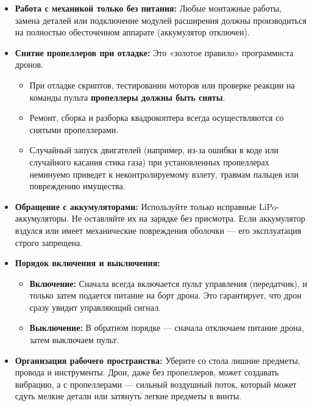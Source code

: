 \begin{itemize}
    \item \textbf{Работа с механикой только без питания:} Любые монтажные работы, замена деталей или подключение модулей расширения должны производиться на полностью обесточенном аппарате (аккумулятор отключен).
    
    \item \textbf{Снятие пропеллеров при отладке:} Это «золотое правило» программиста дронов.
    \begin{itemize}
        \item При отладке скриптов, тестировании моторов или проверке реакции на команды пульта \textbf{пропеллеры должны быть сняты}.
        \item Ремонт, сборка и разборка квадрокоптера всегда осуществляются со снятыми пропеллерами.
        \item Случайный запуск двигателей (например, из-за ошибки в коде или случайного касания стика газа) при установленных пропеллерах неминуемо приведет к неконтролируемому взлету, травмам пальцев или повреждению имущества.
    \end{itemize}

    \item \textbf{Обращение с аккумуляторами:} Используйте только исправные LiPo-аккумуляторы. Не оставляйте их на зарядке без присмотра. Если аккумулятор вздулся или имеет механические повреждения оболочки — его эксплуатация строго запрещена.

    \item \textbf{Порядок включения и выключения:}
    \begin{itemize}
        \item \textbf{Включение:} Сначала всегда включается пульт управления (передатчик), и только затем подается питание на борт дрона. Это гарантирует, что дрон сразу увидит управляющий сигнал.
        \item \textbf{Выключение:} В обратном порядке — сначала отключаем питание дрона, затем выключаем пульт.
    \end{itemize}

    \item \textbf{Организация рабочего пространства:} Уберите со стола лишние предметы, провода и инструменты. Дрон, даже без пропеллеров, может создавать вибрацию, а с пропеллерами — сильный воздушный поток, который может сдуть мелкие детали или затянуть легкие предметы в винты.
\end{itemize}

